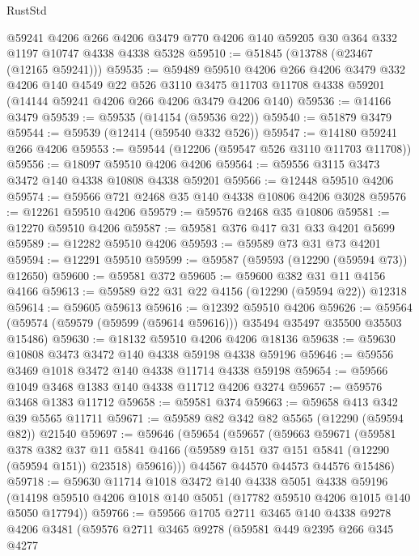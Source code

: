 \begin{lexlean}{RustStd}
\begin{coremodule}
    @59241
    @4206
    @266
    @4206
    @3479
    @770
    @4206
    @140
    @59205
    @30
    @364
    @332
    @1197
    @10747
    @4338
    @4338
    @5328
@59510 := @51845 (@13788 (@23467 (@12165 @59241)))
@59535 := @59489
    @59510
    @4206
    @266
    @4206
    @3479
    @332
    @4206
    @140
    @4549
    @22
    @526
    @3110
    @3475
    @11703
    @11708
    @4338
    @59201
    (@14144 @59241 @4206 @266 @4206 @3479 @4206 @140)
@59536 := @14166 @3479
@59539 := @59535 (@14154 (@59536 @22))
@59540 := @51879 @3479
@59544 := @59539 (@12414 (@59540 @332 @526))
@59547 := @14180 @59241 @266 @4206
@59553 := @59544 (@12206 (@59547 @526 @3110 @11703 @11708))
@59556 := @18097 @59510 @4206 @4206
@59564 := @59556 @3115 @3473 @3472 @140 @4338 @10808 @4338 @59201
@59566 := @12448 @59510 @4206
@59574 := @59566 @721 @2468 @35 @140 @4338 @10806 @4206 @3028
@59576 := @12261 @59510 @4206
@59579 := @59576 @2468 @35 @10806
@59581 := @12270 @59510 @4206
@59587 := @59581 @376 @417 @31 @33 @4201 @5699
@59589 := @12282 @59510 @4206
@59593 := @59589 @73 @31 @73 @4201
@59594 := @12291 @59510
@59599 := @59587 (@59593 (@12290 (@59594 @73)) @12650)
@59600 := @59581 @372
@59605 := @59600 @382 @31 @11 @4156 @4166
@59613 := @59589 @22 @31 @22 @4156 (@12290 (@59594 @22)) @12318
@59614 := @59605 @59613
@59616 := @12392 @59510 @4206
@59626 := @59564 (@59574 (@59579 (@59599 (@59614 @59616))) @35494 @35497 @35500 @35503 @15486)
@59630 := @18132 @59510 @4206 @4206 @18136
@59638 := @59630 @10808 @3473 @3472 @140 @4338 @59198 @4338 @59196
@59646 := @59556 @3469 @1018 @3472 @140 @4338 @11714 @4338 @59198
@59654 := @59566 @1049 @3468 @1383 @140 @4338 @11712 @4206 @3274
@59657 := @59576 @3468 @1383 @11712
@59658 := @59581 @374
@59663 := @59658 @413 @342 @39 @5565 @11711
@59671 := @59589 @82 @342 @82 @5565 (@12290 (@59594 @82)) @21540
@59697 := @59646
    (@59654
      (@59657
        (@59663
          @59671
          (@59581
            @378
            @382
            @37
            @11
            @5841
            @4166
            (@59589 @151 @37 @151 @5841 (@12290 (@59594 @151)) @23518)
            @59616)))
      @44567
      @44570
      @44573
      @44576
      @15486)
@59718 := @59630
    @11714
    @1018
    @3472
    @140
    @4338
    @5051
    @4338
    @59196
    (@14198 @59510 @4206 @1018 @140 @5051 (@17782 @59510 @4206 @1015 @140 @5050 @17794))
@59766 := @59566
    @1705
    @2711
    @3465
    @140
    @4338
    @9278
    @4206
    @3481
    (@59576
      @2711
      @3465
      @9278
      (@59581
        @449
        @2395
        @266
        @345
        @4277

\end{coremodule}
\end{lexlean}
